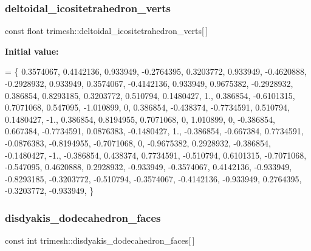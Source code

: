 \subsubsection{\texorpdfstring{deltoidal\+\_\+icositetrahedron\+\_\+verts}{deltoidal\_icositetrahedron\_verts}}
{\footnotesize\ttfamily const float trimesh\+::deltoidal\+\_\+icositetrahedron\+\_\+verts\mbox{[}$\,$\mbox{]}\hspace{0.3cm}{\ttfamily [static]}}

{\bfseries Initial value\+:}
\begin{DoxyCode}
= \{
    0.3574067, 0.4142136, 0.933949,
    -0.2764395, 0.3203772, 0.933949,
    -0.4620888, -0.2928932, 0.933949,
    0.3574067, -0.4142136, 0.933949,
    0.9675382, -0.2928932, 0.386854,
    0.8293185, 0.3203772, 0.510794,
    0.1480427, 1., 0.386854,
    -0.6101315, 0.7071068, 0.547095,
    -1.010899, 0, 0.386854,
    -0.438374, -0.7734591, 0.510794,
    0.1480427, -1., 0.386854,
    0.8194955, 0.7071068, 0,
    1.010899, 0, -0.386854,
    0.667384, -0.7734591, 0.0876383,
    -0.1480427, 1., -0.386854,
    -0.667384, 0.7734591, -0.0876383,
    -0.8194955, -0.7071068, 0,
    -0.9675382, 0.2928932, -0.386854,
    -0.1480427, -1., -0.386854,
    0.438374, 0.7734591, -0.510794,
    0.6101315, -0.7071068, -0.547095,
    0.4620888, 0.2928932, -0.933949,
    -0.3574067, 0.4142136, -0.933949,
    -0.8293185, -0.3203772, -0.510794,
    -0.3574067, -0.4142136, -0.933949,
    0.2764395, -0.3203772, -0.933949,
\}
\end{DoxyCode}
\mbox{\label{namespacetrimesh_a7acd0f4a3bd44c175b8efc7494c2899f}} 
\subsubsection{\texorpdfstring{disdyakis\+\_\+dodecahedron\+\_\+faces}{disdyakis\_dodecahedron\_faces}}
{\footnotesize\ttfamily const int trimesh\+::disdyakis\+\_\+dodecahedron\+\_\+faces\mbox{[}$\,$\mbox{]}\hspace{0.3cm}{\ttfamily [static]}}

\mbox{\label{namespacetrimesh_ac6d6a4e1aa99063b1cfb3921e60ff483}} 
